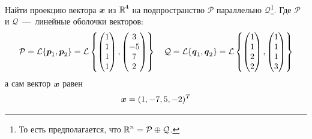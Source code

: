 \documentclass[a4paper,12pt]{article}
\begin{document}
  Найти проекцию вектора $\boldsymbol x$ из $\operatorname{\mathbb R}^4$ на подпространство $\mathcal P$ параллельно $\mathcal Q$\footnote{То есть предполагается, что $\RR^n = \mathcal P \hm\oplus \mathcal Q$.}.
  Где $\mathcal P$ и $\mathcal Q$~---~линейные оболочки векторов:
  \[
    \mathcal P = \mathcal L \{\boldsymbol p_1, \boldsymbol p_2\} = \mathcal L \left\{
      \begin{pmatrix}
        1 \\ 1 \\ 1 \\ 1
      \end{pmatrix},
      \begin{pmatrix}
        3 \\ -5 \\ 7 \\ 2
      \end{pmatrix}
    \right\}
    \quad \mathcal Q = \mathcal L \{\boldsymbol q_1, \boldsymbol q_2\}  = \mathcal L \left\{
      \begin{pmatrix}
        1 \\ 1 \\ 2 \\ 2
      \end{pmatrix},
      \begin{pmatrix}
        1 \\ 1 \\ 1 \\ 3
      \end{pmatrix}
    \right\}
  \]
  а сам вектор $\boldsymbol x$ равен
  \[
    \boldsymbol x = (1, -7, 5, -2)^T
  \]
  
\end{document}
